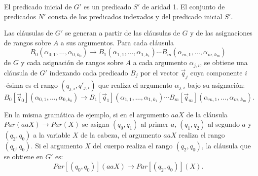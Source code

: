 \documentclass{report}
\theoremstyle{definition}
\theoremstyle{plain}
\theoremstyle{remark}
\begin{document}
El predicado inicial de $G'$ es un predicado $S'$ de aridad 1. El
conjunto de predicados $N'$ consta de los predicados indexados y del
predicado inicial $S'$.

Las cláusulas de $G'$ se generan a partir de las cláusulas de $G$ y de
las asignaciones de rangos sobre $A$ a sus argumentos. Para cada
cláusula
\[
  B_0(\alpha_{0,1}, \ldots, \alpha_{0,k_0}) \to
  B_1(\alpha_{1,1}, \ldots, \alpha_{1,k_1}) \cdots
  B_m(\alpha_{m,1}, \ldots, \alpha_{m,k_m})
\]
de $G$ y cada asignación de rangos sobre $A$ a cada argumento
$\alpha_{j,i}$, se obtiene una cláusula de $G'$ indexando cada
predicado $B_j$ por el vector $\vec q_j$ cuya componente $i$-ésima es
el rango $(q_{j,i}, q'_{j,i})$ que realiza el argumento $\alpha_{j,i}$
bajo su asignación:
\[
  B_0[\vec q_0](\alpha_{0,1}, \ldots, \alpha_{0,k_0}) \to
  B_1[\vec q_1](\alpha_{1,1}, \ldots, \alpha_{1,k_1}) \cdots
  B_m[\vec q_m](\alpha_{m,1}, \ldots, \alpha_{m,k_m}).
\]

En la misma gramática de ejemplo, si en el argumento $aaX$ de la cláusula
$Par(aaX) \to Par(X)$ se asigna $(q_0, q_1)$ al primer $a$,
$(q_1, q_2)$ al segundo $a$ y $(q_2, q_0)$ a la variable $X$ de la
cabeza, el argumento $aaX$ realiza el rango $(q_0, q_0)$. Si el
argumento $X$ del cuerpo realiza el rango $(q_2, q_0)$, la cláusula que
se obtiene en $G'$ es:
\[
  Par[(q_0, q_0)](aaX) \to Par[(q_2, q_0)](X).
\]
\end{document}
